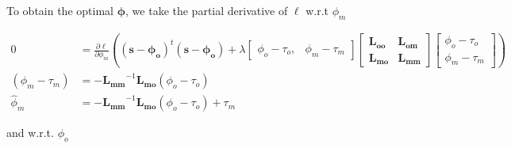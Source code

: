         To obtain the optimal $\mathbf{\phi}$, we take the partial
        derivative of $\ell$ w.r.t $\phi_m$

        \begin{align}
            0 &= \frac{\partial\ell}{\partial\phi_m}\left((\mathbf{s} - \mathbf{\phi_o})^t(\mathbf{s} - \mathbf{\phi_o}) + \lambda
                \begin{bmatrix}
                    \phi_o - \tau_o, & \phi_m - \tau_m
                \end{bmatrix}
                \begin{bmatrix}
                    \mathbf{L_{oo}} & \mathbf{L_{om}} \\ \mathbf{L_{mo}} & \mathbf{L_{mm}}
                \end{bmatrix}
                \begin{bmatrix}
                    \phi_o - \tau_o \\ \phi_m - \tau_m
                \end{bmatrix}\right)\\
            (\phi_m - \tau_m) &= -\mathbf{L_{mm}}^{-1}\mathbf{L_{mo}}(\phi_o - \tau_o) \nonumber\\
            {\hat \phi_m} &= -\mathbf{L_{mm}}^{-1}\mathbf{L_{mo}}(\phi_o - \tau_o) + \tau_m
            \label{eqn:estimate_of_phi_m}
        \end{align}

        \noindent and w.r.t. $\phi_o$

